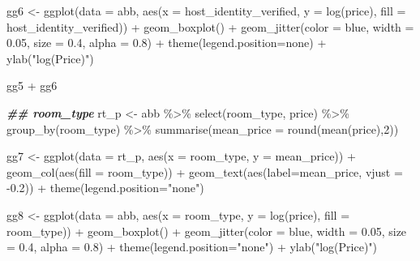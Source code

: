 \documentclass[
]{article}
\newenvironment{Shaded}{\begin{snugshade}}{\end{snugshade}}
\newcommand{\AttributeTok}[1]{\textcolor[rgb]{0.77,0.63,0.00}{#1}}
\newcommand{\DecValTok}[1]{\textcolor[rgb]{0.00,0.00,0.81}{#1}}
\newcommand{\DocumentationTok}[1]{\textcolor[rgb]{0.56,0.35,0.01}{\textbf{\textit{#1}}}}
\newcommand{\FloatTok}[1]{\textcolor[rgb]{0.00,0.00,0.81}{#1}}
\newcommand{\FunctionTok}[1]{\textcolor[rgb]{0.00,0.00,0.00}{#1}}
\newcommand{\NormalTok}[1]{#1}
\newcommand{\OtherTok}[1]{\textcolor[rgb]{0.56,0.35,0.01}{#1}}
\newcommand{\SpecialCharTok}[1]{\textcolor[rgb]{0.00,0.00,0.00}{#1}}
\newcommand{\StringTok}[1]{\textcolor[rgb]{0.31,0.60,0.02}{#1}}
\begin{document}
\begin{Shaded}
\begin{Highlighting}[]
\NormalTok{gg6 }\OtherTok{\textless{}{-}} \FunctionTok{ggplot}\NormalTok{(}\AttributeTok{data =}\NormalTok{ abb, }\FunctionTok{aes}\NormalTok{(}\AttributeTok{x =}\NormalTok{ host\_identity\_verified, }
                          \AttributeTok{y =} \FunctionTok{log}\NormalTok{(price), }
                          \AttributeTok{fill =}\NormalTok{ host\_identity\_verified)) }\SpecialCharTok{+} 
            \FunctionTok{geom\_boxplot}\NormalTok{() }\SpecialCharTok{+} 
            \FunctionTok{geom\_jitter}\NormalTok{(}\AttributeTok{color =} \StringTok{\textquotesingle{}blue\textquotesingle{}}\NormalTok{, }\AttributeTok{width =} \FloatTok{0.05}\NormalTok{, }\AttributeTok{size =} \FloatTok{0.4}\NormalTok{, }\AttributeTok{alpha =} \FloatTok{0.8}\NormalTok{) }\SpecialCharTok{+}
            \FunctionTok{theme}\NormalTok{(}\AttributeTok{legend.position=}\StringTok{\textquotesingle{}none\textquotesingle{}}\NormalTok{) }\SpecialCharTok{+}
            \FunctionTok{ylab}\NormalTok{(}\StringTok{"log(Price)"}\NormalTok{)}

\NormalTok{gg5 }\SpecialCharTok{+}\NormalTok{ gg6}


\DocumentationTok{\#\# room\_type}
\NormalTok{rt\_p }\OtherTok{\textless{}{-}}\NormalTok{ abb }\SpecialCharTok{\%\textgreater{}\%} \FunctionTok{select}\NormalTok{(room\_type, price) }\SpecialCharTok{\%\textgreater{}\%} \FunctionTok{group\_by}\NormalTok{(room\_type) }\SpecialCharTok{\%\textgreater{}\%} \FunctionTok{summarise}\NormalTok{(}\AttributeTok{mean\_price =} \FunctionTok{round}\NormalTok{(}\FunctionTok{mean}\NormalTok{(price),}\DecValTok{2}\NormalTok{))}

\NormalTok{gg7 }\OtherTok{\textless{}{-}} \FunctionTok{ggplot}\NormalTok{(}\AttributeTok{data =}\NormalTok{ rt\_p, }\FunctionTok{aes}\NormalTok{(}\AttributeTok{x =}\NormalTok{ room\_type, }\AttributeTok{y =}\NormalTok{ mean\_price)) }\SpecialCharTok{+} 
      \FunctionTok{geom\_col}\NormalTok{(}\FunctionTok{aes}\NormalTok{(}\AttributeTok{fill =}\NormalTok{ room\_type)) }\SpecialCharTok{+}
      \FunctionTok{geom\_text}\NormalTok{(}\FunctionTok{aes}\NormalTok{(}\AttributeTok{label=}\NormalTok{mean\_price, }\AttributeTok{vjust =} \SpecialCharTok{{-}}\FloatTok{0.2}\NormalTok{)) }\SpecialCharTok{+}
      \FunctionTok{theme}\NormalTok{(}\AttributeTok{legend.position=}\StringTok{"none"}\NormalTok{)}
  
\NormalTok{gg8 }\OtherTok{\textless{}{-}} \FunctionTok{ggplot}\NormalTok{(}\AttributeTok{data =}\NormalTok{ abb, }\FunctionTok{aes}\NormalTok{(}\AttributeTok{x =}\NormalTok{ room\_type, }\AttributeTok{y =} \FunctionTok{log}\NormalTok{(price), }\AttributeTok{fill =}\NormalTok{ room\_type)) }\SpecialCharTok{+} 
      \FunctionTok{geom\_boxplot}\NormalTok{() }\SpecialCharTok{+} 
      \FunctionTok{geom\_jitter}\NormalTok{(}\AttributeTok{color =} \StringTok{\textquotesingle{}blue\textquotesingle{}}\NormalTok{, }\AttributeTok{width =} \FloatTok{0.05}\NormalTok{, }\AttributeTok{size =} \FloatTok{0.4}\NormalTok{, }\AttributeTok{alpha =} \FloatTok{0.8}\NormalTok{) }\SpecialCharTok{+}
      \FunctionTok{theme}\NormalTok{(}\AttributeTok{legend.position=}\StringTok{"none"}\NormalTok{) }\SpecialCharTok{+}
      \FunctionTok{ylab}\NormalTok{(}\StringTok{"log(Price)"}\NormalTok{)}


\end{Highlighting}
\end{Shaded}
\end{document}
